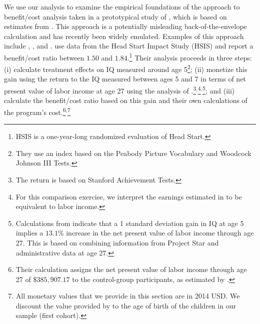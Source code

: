 We use our analysis to examine the empirical foundations of the approach to benefit/cost analysis taken in a prototypical study of \citet{Kline_Walters_2016_QJE}, which is based on estimates from \citet{Chetty_Friedman_etal_2011_QJoE}. This approach is a potentially misleading back-of-the-envelope calculation and has recently been widely emulated. Examples of this approach include \citet{Attanasio_Kugler_Meghir_2011_AEJAE}, \cite{Behrman-et-al_2011_JHR-Progresa}, and \cite{Deshpande_Yue_2017_Screened_Unpublished}. \citet{Kline_Walters_2016_QJE} use data from the Head Start Impact Study (HSIS) and report a benefit/cost ratio between $1.50$ and $1.84$.\footnote{HSIS is a one-year-long randomized evaluation of Head Start.} Their analysis proceeds in three steps: (i) calculate treatment effects on IQ measured around age 5\footnote{They use an index based on the Peabody Picture Vocabulary and Woodcock Johnson III Tests.}; (ii) monetize this gain using the return to the IQ measured between ages 5 and 7 in terms of net present value of labor income at age 27 using the analysis of \citet{Chetty_Friedman_etal_2011_QJoE}.\footnote{The \citet{Chetty_Friedman_etal_2011_QJoE} return is based on Stanford Achievement Tests.}$^,$\footnote{For this comparison exercise, we interpret the earnings estimated in \citet{Chetty_Friedman_etal_2011_QJoE} to be equivalent to labor income.}$^,$\footnote{Calculations from \citet{Chetty_Friedman_etal_2011_QJoE} indicate that a 1 standard deviation gain in IQ at age 5 implies a $13.1\%$ increase in the net present value of labor income through age 27. This is based on combining information from Project Star and administrative data at age 27.}; and (iii) calculate the benefit/cost ratio based on this gain and their own calculations of the program's cost.\footnote{Their calculation assigns the net present value of labor income through age 27 of $\$385,907.17$ to the control-group participants, as estimated by  \citet{Chetty_Friedman_etal_2011_QJoE}.}$^,$\footnote{All monetary values that we provide in this section are in 2014 USD. We discount the value provided by \citet{Chetty_Friedman_etal_2011_QJoE} to the age of birth of the children in our sample (first cohort).}

